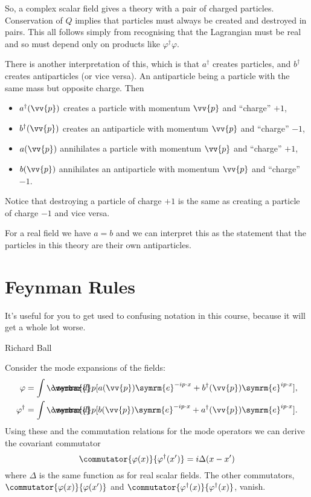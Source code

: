 \documentclass[fleqn]{NotesClass}
\newcommand{\e}{\symrm{e}}
\newcommand{\hermit}{{\dagger}}
\newcommand\dbar{\ThisStyle{\ensurestackMath{%
            \stackengine{-.3\LMpt}{\SavedStyle \symrm{d}}{\SavedStyle\overbar{}%
                \mkern2.25mu}{O}{r}{F}{F}{L}}}}
\newcommand{\invariantmeasure}[1]{\dbar #1}
\begin{document}
    So, a complex scalar field gives a theory with a pair of charged particles.
    Conservation of \(Q\) implies that particles must always be created and destroyed in pairs.
    This all follows simply from recognising that the Lagrangian must be real and so must depend only on products like \(\varphi^\hermit \varphi\).
    
    There is another interpretation of this, which is that \(a^\hermit\) creates particles, and \(b^\hermit\) creates antiparticles (or vice versa).
    An antiparticle being a particle with the same mass but opposite charge.
    Then
    \begin{itemize}
        \item \(a^\hermit(\vv{p})\) creates a particle with momentum \(\vv{p}\) and \enquote{charge} \(+1\),
        \item \(b^\hermit(\vv{p})\) creates an antiparticle with momentum \(\vv{p}\) and \enquote{charge} \(-1\),
        \item \(a(\vv{p})\) annihilates a particle with momentum \(\vv{p}\) and \enquote{charge} \(+1\),
        \item \(b(\vv{p})\) annihilates an antiparticle with momentum \(\vv{p}\) and \enquote{charge} \(-1\).
    \end{itemize}
    Notice that destroying a particle of charge \(+1\) is the same as creating a particle of charge \(-1\) and vice versa.
    
    For a real field we have \(a = b\) and we can interpret this as the statement that the particles in this theory are their own antiparticles.
    
    \section{Feynman Rules}
    \epigraph{It's useful for you to get used to confusing notation in this course, because it will get a whole lot worse.}{Richard Ball}
    Consider the mode expansions of the fields:
    \begin{align}
        \varphi &= \int \invariantmeasure{p} [a(\vv{p})\e^{-ip\cdot x} + b^\hermit(\vv{p})\e^{ip\cdot x}],\\
        \varphi^\hermit &= \int \invariantmeasure{p} [b(\vv{p})\e^{-ip\cdot x} + a^\hermit(\vv{p})\e^{ip\cdot x}].
    \end{align}
    Using these and the commutation relations for the mode operators we can derive the covariant commutator
    \begin{equation}
        \commutator{\varphi(x)}{\varphi^\hermit(x')} = i\Delta(x - x')
    \end{equation}
    where \(\Delta\) is the same function as for real scalar fields.
    The other commutators, \(\commutator{\varphi(x)}{\varphi(x')}\) and \(\commutator{\varphi^\hermit(x)}{\varphi^\hermit(x)}\), vanish.
    
\end{document}
